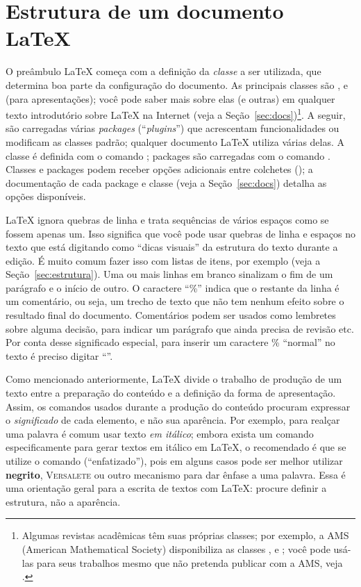 \section{Estrutura de um documento \LaTeX{}}
\label{sec:basico}

O preâmbulo \LaTeX{} começa com a definição da \emph{classe} a ser utilizada,
que determina boa parte da configuração do documento. As principais classes
são ,  e  (para apresentações); você pode
saber mais sobre elas (e outras) em qualquer texto introdutório sobre \LaTeX{}
na Internet (veja a Seção~\ref{sec:docs})\footnote{Algumas revistas acadêmicas
têm suas próprias classes; por exemplo, a AMS (American Mathematical Society)
disponibiliza as classes ,  e ; você
pode usá-las para seus trabalhos mesmo que não pretenda publicar com a AMS,
veja .}. A seguir, são carregadas
várias \emph{packages} (``\emph{plugins}'') que acrescentam funcionalidades ou
modificam as classes padrão; qualquer documento \LaTeX{} utiliza várias delas.
A classe é definida com o comando ;
packages são carregadas com o comando .
Classes e packages podem receber opções adicionais entre colchetes
(); a documentação
de cada package e classe (veja a Seção~\ref{sec:docs}) detalha as opções
disponíveis.

\LaTeX{} ignora quebras de linha e trata sequências de vários espaços como
se fossem apenas um. Isso significa que você pode usar quebras de linha e
espaços no texto que está digitando como ``dicas visuais'' da estrutura do
texto durante a edição. É muito comum fazer isso com listas de itens, por
exemplo (veja a Seção~\ref{sec:estrutura}). Uma ou mais linhas em branco
sinalizam o fim de um parágrafo e o início de outro. O caractere ``\%''
indica que o restante da linha é um comentário, ou seja, um trecho de texto
que não tem nenhum efeito sobre o resultado final do documento. Comentários
podem ser usados como lembretes sobre alguma decisão, para indicar um
parágrafo que ainda precisa de revisão etc. Por conta desse significado
especial, para inserir um caractere \% ``normal'' no texto é preciso digitar
``\ltxcmd{\%}''.

Como mencionado anteriormente, \LaTeX{} divide o trabalho de produção
de um texto entre a preparação do conteúdo e a definição da forma de
apresentação. Assim, os comandos usados durante a produção do conteúdo
procuram expressar o \emph{significado} de cada elemento, e não sua
aparência. Por exemplo, para realçar uma palavra é comum usar texto
\textit{em itálico}; embora exista um comando especificamente para gerar
textos em itálico em \LaTeX{}, o recomendado é que se utilize o comando
 (``enfatizado''), pois em alguns casos pode ser melhor
utilizar \textbf{negrito}, \textsc{Versalete} ou outro mecanismo para
dar ênfase a uma palavra. Essa é uma orientação geral para a escrita de
textos com \LaTeX{}: procure definir a estrutura, não a aparência.

